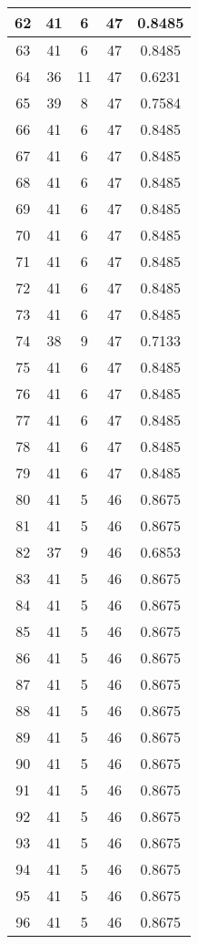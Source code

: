 \documentclass[letterpaper, 12pt]{article}
\begin{document}
\begin{longtable}{|c|c|c|c|c|}
\hline
62 & 41 & 6 & 47 & 0.8485 \\
\hline
63 & 41 & 6 & 47 & 0.8485 \\
\hline
64 & 36 & 11 & 47 & 0.6231 \\
\hline
65 & 39 & 8 & 47 & 0.7584 \\
\hline
66 & 41 & 6 & 47 & 0.8485 \\
\hline
67 & 41 & 6 & 47 & 0.8485 \\
\hline
68 & 41 & 6 & 47 & 0.8485 \\
\hline
69 & 41 & 6 & 47 & 0.8485 \\
\hline
70 & 41 & 6 & 47 & 0.8485 \\
\hline
71 & 41 & 6 & 47 & 0.8485 \\
\hline
72 & 41 & 6 & 47 & 0.8485 \\
\hline
73 & 41 & 6 & 47 & 0.8485 \\
\hline
74 & 38 & 9 & 47 & 0.7133 \\
\hline
75 & 41 & 6 & 47 & 0.8485 \\
\hline
76 & 41 & 6 & 47 & 0.8485 \\
\hline
77 & 41 & 6 & 47 & 0.8485 \\
\hline
78 & 41 & 6 & 47 & 0.8485 \\
\hline
79 & 41 & 6 & 47 & 0.8485 \\
\hline
80 & 41 & 5 & 46 & 0.8675 \\
\hline
81 & 41 & 5 & 46 & 0.8675 \\
\hline
82 & 37 & 9 & 46 & 0.6853 \\
\hline
83 & 41 & 5 & 46 & 0.8675 \\
\hline
84 & 41 & 5 & 46 & 0.8675 \\
\hline
85 & 41 & 5 & 46 & 0.8675 \\
\hline
86 & 41 & 5 & 46 & 0.8675 \\
\hline
87 & 41 & 5 & 46 & 0.8675 \\
\hline
88 & 41 & 5 & 46 & 0.8675 \\
\hline
89 & 41 & 5 & 46 & 0.8675 \\
\hline
90 & 41 & 5 & 46 & 0.8675 \\
\hline
91 & 41 & 5 & 46 & 0.8675 \\
\hline
92 & 41 & 5 & 46 & 0.8675 \\
\hline
93 & 41 & 5 & 46 & 0.8675 \\
\hline
94 & 41 & 5 & 46 & 0.8675 \\
\hline
95 & 41 & 5 & 46 & 0.8675 \\
\hline
96 & 41 & 5 & 46 & 0.8675 \\

\end{longtable}
\end{document}
